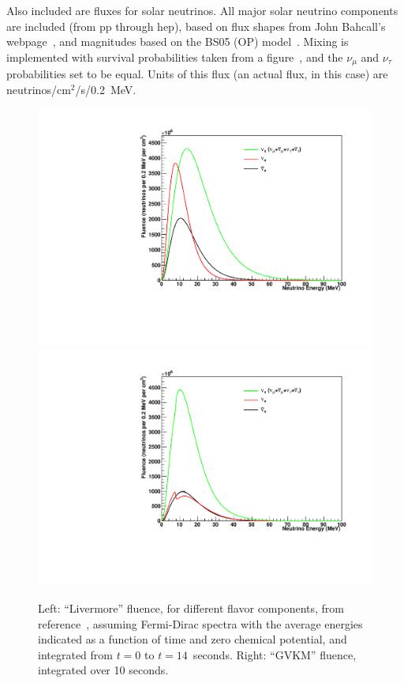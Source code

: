 \documentclass[12pt]{article}
\begin{document}
Also included are fluxes for solar neutrinos.  All major solar neutrino components
are included (from pp through hep), based on flux shapes from John Bahcall's
webpage~\cite{bahcall_webpage}, and magnitudes based on the BS05 (OP) 
model~\cite{Bahcall:2004pz}.  Mixing is implemented with survival probabilities
taken from a figure~\cite{Berryman:2014qha}, and the $\nu_{\mu}$ and $\nu_{\tau}$
probabilities set to be equal.  Units of this flux (an actual flux, in this case)
are neutrinos/cm$^{2}$/s/0.2~MeV.


\begin{figure}
\includegraphics[height=.3\textheight]{figures/flux_livermore.pdf}
\includegraphics[height=.3\textheight]{figures/flux_gvkm.pdf}

\caption{Left: ``Livermore'' fluence, for different flavor components,
  from reference~\cite{Totani:1997vj}, assuming Fermi-Dirac spectra with
  the average energies indicated as a function of time and zero
  chemical potential, and integrated from $t=0$ to $t=14$~seconds.  Right: ``GVKM'' fluence, integrated over 10
  seconds.}\label{fig:fluxes}
\end{figure}
\end{document}
